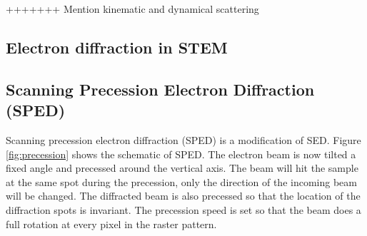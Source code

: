 %
%
%
%
%
%
%
%
%

+++++++ Mention kinematic and dynamical scattering


	\subsection{Electron diffraction in STEM}
	
	\subsection{Scanning Precession Electron Diffraction (SPED)}
Scanning precession electron diffraction (SPED) is a modification of SED. Figure \ref{fig:precession} shows the schematic of SPED. The electron beam is now tilted a fixed angle and precessed around the vertical axis. The beam will hit the sample at the same spot during the precession, only the direction of the incoming beam will be changed. The diffracted beam is also precessed so that the location of the diffraction spots is invariant. The precession speed is set so that the beam does a full rotation at every pixel in the raster pattern.

